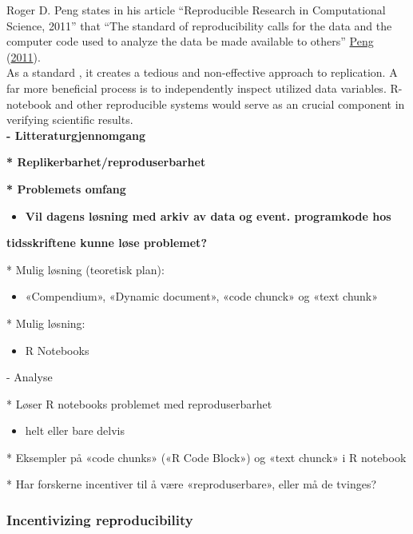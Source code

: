 \documentclass[
  12pt,
  norsk,
]{article}
\providecommand{\tightlist}{%
  \setlength{\itemsep}{0pt}\setlength{\parskip}{0pt}}
\begin{document}
Roger D. Peng states in his article ``Reproducible Research in
Computational Science, 2011'' that ``The standard of reproducibility
calls for the data and the computer code used to analyze the data be
made available to others'' \protect\hyperlink{ref-peng2011}{Peng}
(\protect\hyperlink{ref-peng2011}{2011}).\\
As a standard , it creates a tedious and non-effective approach to
replication. A far more beneficial process is to independently inspect
utilized data variables. R-notebook and other reproducible systems would
serve as an crucial component in verifying scientific results.\\

\textbf{- Litteraturgjennomgang}

\textbf{* Replikerbarhet/reproduserbarhet}

\textbf{* Problemets omfang}

\begin{itemize}
\tightlist
\item
  \textbf{Vil dagens løsning med arkiv av data og event. programkode
  hos}
\end{itemize}

\textbf{tidsskriftene kunne løse problemet?}

* Mulig løsning (teoretisk plan):

\begin{itemize}
\tightlist
\item
  «Compendium», «Dynamic document», «code chunck» og «text chunk»
\end{itemize}

* Mulig løsning:

\begin{itemize}
\tightlist
\item
  R Notebooks
\end{itemize}

- Analyse

* Løser R notebooks problemet med reproduserbarhet

\begin{itemize}
\tightlist
\item
  helt eller bare delvis
\end{itemize}

* Eksempler på «code chunks» («R Code Block») og «text chunck» i R
notebook

* Har forskerne incentiver til å være «reproduserbare», eller må de
tvinges?

\hypertarget{incentivizing-reproducibility}{%
\subsubsection{Incentivizing
reproducibility}\label{incentivizing-reproducibility}}
\end{document}
